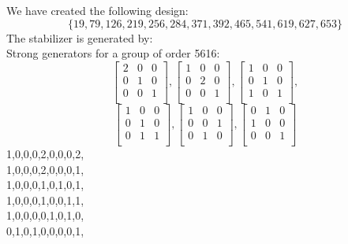 We have created the following design:
$$
\{ 19, 79, 126, 219, 256, 284, 371, 392, 465, 541, 619, 627, 653 \}
$$
The stabilizer is generated by:\\
Strong generators for a group of order 5616:
$$
\left[
\begin{array}{*{3}{r}}
2 & 0 & 0\\
0 & 1 & 0\\
0 & 0 & 1\\
\end{array}
\right]
, 
\left[
\begin{array}{*{3}{r}}
1 & 0 & 0\\
0 & 2 & 0\\
0 & 0 & 1\\
\end{array}
\right]
, 
\left[
\begin{array}{*{3}{r}}
1 & 0 & 0\\
0 & 1 & 0\\
1 & 0 & 1\\
\end{array}
\right]
, 
$$
$$
\left[
\begin{array}{*{3}{r}}
1 & 0 & 0\\
0 & 1 & 0\\
0 & 1 & 1\\
\end{array}
\right]
, 
\left[
\begin{array}{*{3}{r}}
1 & 0 & 0\\
0 & 0 & 1\\
0 & 1 & 0\\
\end{array}
\right]
, 
\left[
\begin{array}{*{3}{r}}
0 & 1 & 0\\
1 & 0 & 0\\
0 & 0 & 1\\
\end{array}
\right]
$$
1,0,0,0,2,0,0,0,2,\\
1,0,0,0,2,0,0,0,1,\\
1,0,0,0,1,0,1,0,1,\\
1,0,0,0,1,0,0,1,1,\\
1,0,0,0,0,1,0,1,0,\\
0,1,0,1,0,0,0,0,1,\\
